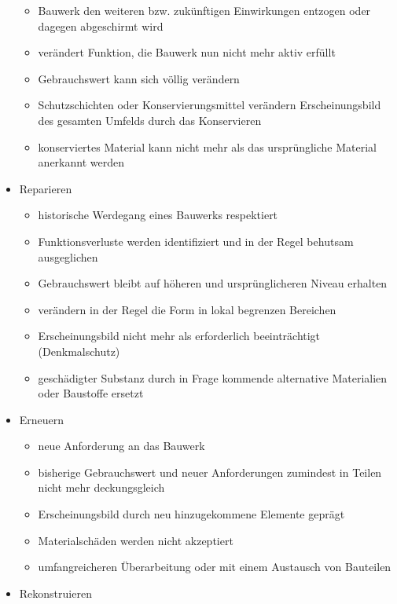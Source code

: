 \documentclass[fleqn,twoside]{article}
\begin{document}
\begin{itemize}
\begin{itemize}
                \item Bauwerk den weiteren bzw. zukünftigen Einwirkungen entzogen oder dagegen abgeschirmt wird
                \item verändert Funktion, die Bauwerk nun nicht mehr aktiv erfüllt
                \item Gebrauchswert kann sich völlig verändern
                \item Schutzschichten oder Konservierungsmittel verändern Erscheinungsbild des gesamten Umfelds durch das Konservieren
                \item konserviertes Material kann nicht mehr als das ursprüngliche Material anerkannt werden
            \end{itemize}
        \item Reparieren
            \begin{itemize}
                \item historische Werdegang eines Bauwerks respektiert
                \item Funktionsverluste werden identifiziert und in der Regel behutsam ausgeglichen
                \item Gebrauchswert bleibt auf höheren und ursprünglicheren Niveau erhalten
                \item verändern in der Regel die Form in lokal begrenzen Bereichen
                \item Erscheinungsbild nicht mehr als erforderlich beeinträchtigt (Denkmalschutz)
                \item geschädigter Substanz durch in Frage kommende alternative Materialien oder Baustoffe ersetzt
            \end{itemize}
        \item Erneuern
            \begin{itemize}
                \item neue Anforderung an das Bauwerk
                \item bisherige Gebrauchswert und neuer Anforderungen zumindest in Teilen nicht mehr deckungsgleich
                \item Erscheinungsbild durch neu hinzugekommene Elemente geprägt
                \item Materialschäden werden nicht akzeptiert
                \item umfangreicheren Überarbeitung oder mit einem Austausch von Bauteilen
            \end{itemize}
        \item Rekonstruieren

\end{itemize}
\end{document}
